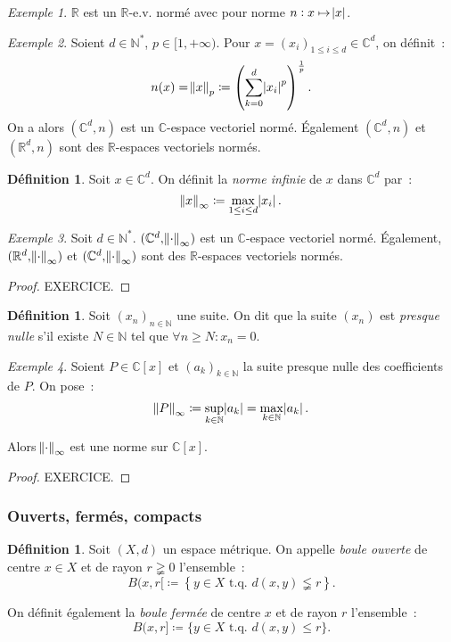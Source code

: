 \documentclass{report}
\theoremstyle{definition}
\newtheorem{déf}[thm]{Définition}
\theoremstyle{remark}
\newtheorem{ex}{Exemple}[chapter]
\newcommand{\C}{\mathbb C}
\newcommand{\R}{\mathbb R}
\newcommand{\N}{\mathbb N}
\newcommand{\Ns}{\N^{*}}
\newcommand{\tq}{\text{ t.q. }}
\newcommand{\seq}[3]{\left(#1_{#2}\right)_{#2 \in #3}}
\newcommand{\pinfty}{{+\infty}}
\newcommand{\evn}{espace vectoriel normé}
\begin{document}
				\begin{ex} $\R$ est un $\R$-e.v. normé avec pour norme $n : x \mapsto \abs x$. \end{ex}

				\begin{ex} Soient $d \in \Ns$, $p \in [1, \pinfty)$. Pour $x = (x_i)_{1 \leq i \leq d} \in \C^d$, on définit~:
				\[n(x) = \norm x_p \coloneqq \left(\sum_{k=0}^d\abs {x_i}^p\right)^{\frac 1p}.\]
				On a alors $(\C^d, n)$ est un $\C$-\evn. Également $(\C^d, n)$ et $(\R^d, n)$  sont des $\R$-espaces vectoriels normés.
				\end{ex}

				\begin{déf} Soit $x \in \C^d$. On définit la \textit{norme infinie} de $x$ dans $\C^d$ par~:
				\[\norm x_\infty \coloneqq \max_{1 \leq i \leq d}\abs {x_i}.\]
				\end{déf}

				\begin{ex} Soit $d \in \Ns$. $(\C^d, \norm \cdot_\infty)$ est un $\C$-\evn. Également, $(\R^d, \norm \cdot_\infty)$
				et $(\C^d, \norm \cdot_\infty)$ sont des $\R$-espaces vectoriels normés. \end{ex}

				\begin{proof} EXERCICE.
				\end{proof}

				\begin{déf} Soit $\seq xn\N$ une suite. On dit que la suite $(x_n)$ est \textit{presque nulle} s'il existe $N \in \N$ tel que
				$\forall n \geq N : x_n = 0$. \end{déf}

				\begin{ex} Soient $P \in \C[x]$ et $\seq ak\N$ la suite presque nulle des coefficients de $P$. On pose~:
				\[\norm P_\infty \coloneqq \sup_{k \in \N}\abs {a_k} = \max_{k \in \N}\abs {a_k}.\]

				Alors $\norm \cdot_\infty$ est une norme sur $\C[x]$.
				\end{ex}

				\begin{proof} EXERCICE.
				\end{proof}

			\subsubsection{Ouverts, fermés, compacts}
				\begin{déf} Soit $(X, d)$ un espace métrique. On appelle \textit{boule ouverte} de centre $x \in X$ et de rayon $r \gneqq 0$ l'ensemble~:
				\[B(x, r[ \coloneqq \left\{y \in X \tq d(x, y) \lneqq r\right\}.\]

				On définit également la \textit{boule fermée} de centre $x$ et de rayon $r$ l'ensemble~:
				\[B(x, r] \coloneqq \{y \in X \tq d(x, y) \leq r\}.\]
				\end{déf}
\end{document}
